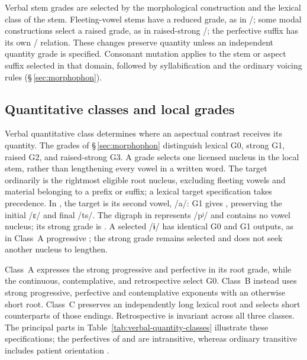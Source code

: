 Verbal stem grades are selected by the morphological construction and the lexical
class of the stem. Fleeting-vowel stems have a reduced grade, as in
/; some modal constructions select a raised grade,
as in raised-strong /; the perfective suffix has its own
/ relation. These changes preserve quantity unless an
independent quantity grade is specified. Consonant mutation applies to the stem
or aspect suffix selected in that domain, followed by syllabification and the
ordinary voicing rules (§\,\ref{sec:morphophon}).

\subsection{Quantitative classes and local grades}\label{sec:verbal-quantity}

Verbal quantitative class determines where an aspectual contrast receives
its quantity. The grades of §\,\ref{sec:morphophon} distinguish lexical
G0, strong G1, raised G2, and raised-strong G3. A grade selects one
licensed nucleus in the local stem, rather than lengthening every vowel
in a written word. The target ordinarily is the rightmost eligible
root nucleus, excluding fleeting vowels and material belonging to a
prefix or suffix; a lexical target specification takes precedence.
In  , the target is its second vowel, /a/:
G1 gives , preserving the initial /ɛ/ and final /ts/.
The digraph  in  represents /pʲ/ and contains no
vowel nucleus; its strong grade is . A selected /ɨ/ has identical
G0 and G1 outputs, as in Class~A progressive ; the strong
grade remains selected and does not seek another nucleus to lengthen.

Class~A expresses the strong progressive and perfective in its root
grade, while the continuous, contemplative, and retrospective select
G0. Class~B instead uses strong progressive, perfective and contemplative
exponents with an otherwise short root. Class~C preserves an independently
long lexical root and selects short counterparts of those endings.
Retrospective  is invariant across all three classes. The principal parts in
Table~\ref{tab:verbal-quantity-classes} illustrate these specifications;
the perfectives of  and  are intransitive,
whereas ordinary transitive  includes patient orientation
.



